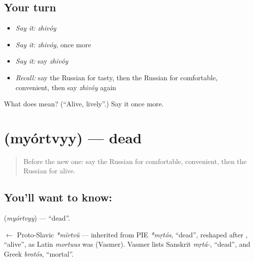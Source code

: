 \subsection*{Your turn}
\begin{itemize}
\raggedright
  \item \emph{Say it:} \emph{zhivóy}
  \item \emph{Say it:} \emph{zhivóy}, once more
  \item \emph{Say it:} say \emph{zhivóy}
  \item \emph{Recall:} say the Russian for tasty, then the Russian for comfortable, convenient, then say \emph{zhivóy} again
\end{itemize}

\begin{tcolorbox}[breakable,colback=teal!4,colframe=teal!35!black,title={Before you move on}]
What does  mean? (\textquotedblleft{}Alive, lively\textquotedblright{}.) Say it once more.
\end{tcolorbox}
\section[\texorpdfstring{\ru{мёртвый} (myórtvyy)}{мёртвый (myórtvyy)}]{ (myórtvyy) — dead}

\label{lesson:RU-C158-myortvyy}



\begin{quote}
Before the new one: say the Russian for comfortable, convenient, then the Russian for alive.
\end{quote}

\subsection*{You'll want to know: }
\textbf{} (\emph{myórtvyy}) — \textquotedblleft{}dead\textquotedblright{}.

\begin{cousinweb}
\textbf{} $\leftarrow$ Proto-Slavic \emph{*mĭrtvŭ} — inherited from PIE \emph{*mṛtós}, \textquotedblleft{}dead\textquotedblright{}, reshaped after \emph{}, \textquotedblleft{}alive\textquotedblright{}, as Latin \emph{mortuus} was (Vasmer). Vasmer lists Sanskrit \emph{mṛtá-}, \textquotedblleft{}dead\textquotedblright{}, and Greek \emph{brotós}, \textquotedblleft{}mortal\textquotedblright{}.
\end{cousinweb}

